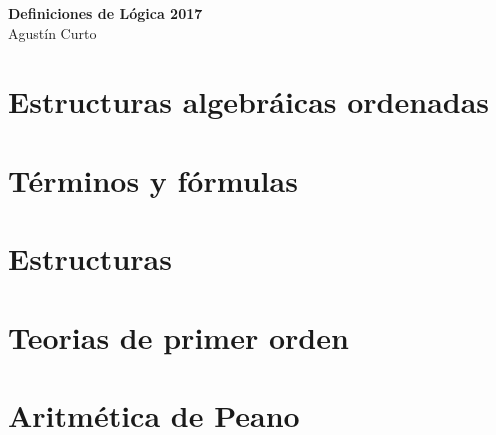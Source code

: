 \documentclass[12pt,a4paper]{article}
\begin{document}
	\begin{center}
		\Huge \textbf{Definiciones de Lógica 2017} \\
		\vspace{3mm}
		\large Agustín Curto
	\end{center}
	
	\part{Estructuras algebráicas ordenadas}
		
		
		
		
		
	
	\part{Términos y fórmulas}
	
	\part{Estructuras}
	
	\part{Teorias de primer orden}
	
	\part{Aritmética de Peano}
\end{document}
